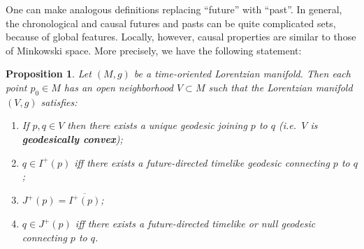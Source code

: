 \documentclass[10pt]{amsart}
\newtheorem{Prop}[Thm]{Proposition}
\theoremstyle{definition}
\theoremstyle{remark}
\begin{document}
One can make analogous definitions replacing ``future'' with ``past''. In general, the chronological and causal futures and pasts can be quite complicated sets, because of global features. Locally, however, causal properties are similar to those of Minkowski space. More precisely, we have the following statement:

\begin{Prop} \label{prop7.7.1}
Let $(M,g)$ be a time-oriented Lorentzian manifold. Then each point $p_0\in M$ has an open neighborhood $V \subset M$ such that the Lorentzian manifold $(V,g)$ satisfies:
\begin{enumerate}
\item If $p,q \in V$ then there exists a unique geodesic joining $p$ to $q$ (i.e.~$V$ is {\bf geodesically convex});
\item $q\in I^+(p)$ iff there exists a future-directed timelike geodesic connecting $p$ to $q$;
\item $J^+(p) = \overline{I^+(p)}$;
\item $q \in J^+(p)$ iff there exists a future-directed timelike or null geodesic connecting $p$ to $q$.
\end{enumerate}
\end{Prop}
\end{document}
